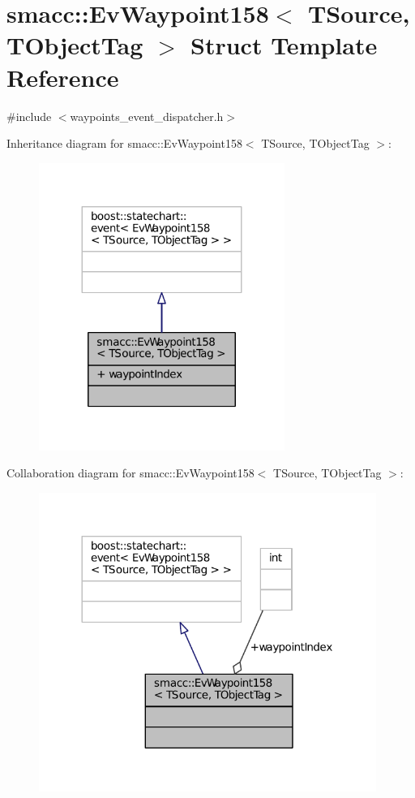 \hypertarget{structsmacc_1_1EvWaypoint158}{}\section{smacc\+:\+:Ev\+Waypoint158$<$ T\+Source, T\+Object\+Tag $>$ Struct Template Reference}
\label{structsmacc_1_1EvWaypoint158}


{\ttfamily \#include $<$waypoints\+\_\+event\+\_\+dispatcher.\+h$>$}



Inheritance diagram for smacc\+:\+:Ev\+Waypoint158$<$ T\+Source, T\+Object\+Tag $>$\+:
\nopagebreak
\begin{figure}[H]
\begin{center}
\leavevmode
\includegraphics[width=227pt]{structsmacc_1_1EvWaypoint158__inherit__graph}
\end{center}
\end{figure}


Collaboration diagram for smacc\+:\+:Ev\+Waypoint158$<$ T\+Source, T\+Object\+Tag $>$\+:
\nopagebreak
\begin{figure}[H]
\begin{center}
\leavevmode
\includegraphics[width=312pt]{structsmacc_1_1EvWaypoint158__coll__graph}
\end{center}
\end{figure}
